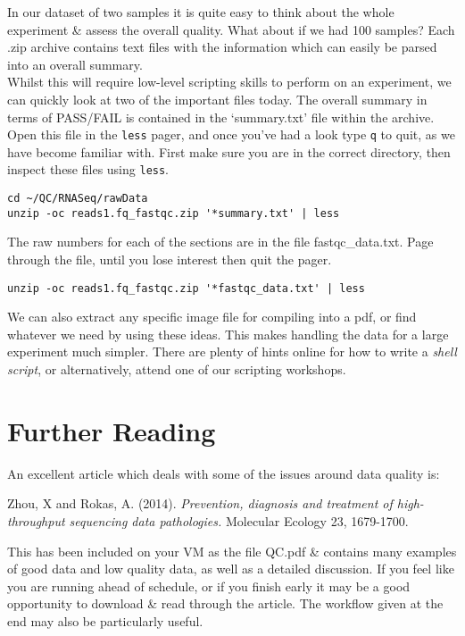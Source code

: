 \begin{advanced}
In our dataset of two samples it is quite easy to think about the whole experiment \& assess the overall quality.
What about if we had 100 samples? 
Each .zip archive contains text files with the information which can easily be parsed into an overall summary. \\

Whilst this will require low-level scripting skills to perform on an experiment, we can quickly look at two of the important files today.
The overall summary in terms of PASS/FAIL is contained in the `summary.txt' file within the archive.
Open this file in the \texttt{less} pager, and once you've had a look type \texttt{q} to quit, as we have become familiar with.
First make sure you are in the correct directory, then inspect these files using \texttt{less}.
\begin{lstlisting}
cd ~/QC/RNASeq/rawData
unzip -oc reads1.fq_fastqc.zip '*summary.txt' | less
\end{lstlisting}

The raw numbers for each of the sections are in the file fastqc\_data.txt.
Page through the file, until you lose interest then quit the pager.
\begin{lstlisting}
unzip -oc reads1.fq_fastqc.zip '*fastqc_data.txt' | less
\end{lstlisting}

We can also extract any specific image file for compiling into a pdf, or find whatever we need by using these ideas.
This makes handling the data for a large experiment much simpler.
There are plenty of hints online for how to write a \textit{shell script}, or alternatively, attend one of our scripting workshops.
\end{advanced}

\section{Further Reading}
An excellent article which deals with some of the issues around data quality is:

Zhou, X and Rokas, A. (2014). \textit{Prevention, diagnosis and treatment of high-throughput sequencing data pathologies.} Molecular Ecology 23, 1679-1700.

This has been included on your VM as the file QC.pdf \& contains many examples of good data and low quality data, as well as a detailed discussion.
If you feel like you are running ahead of schedule, or if you finish early it may be a good opportunity to download \& read through the article.
The workflow given at the end may also be particularly useful.